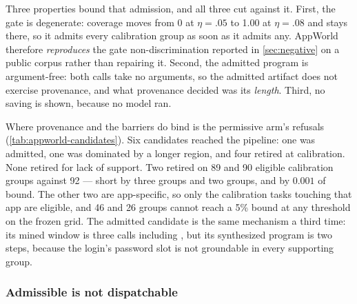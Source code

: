Three properties bound that admission, and all three cut against it. First, the gate is
degenerate: coverage moves from 0 at $\eta=.05$ to 1.00 at $\eta=.08$ and stays there, so it
admits every calibration group as soon as it admits any. AppWorld therefore \emph{reproduces}
the gate non-discrimination reported in \cref{sec:negative} on a public corpus rather than
repairing it. Second, the admitted program is argument-free: both calls take no arguments, so
the admitted artifact does not exercise provenance, and what provenance decided was its
\emph{length}. Third, no saving is shown, because no model ran.

\begin{table}[t]
  \centering
  \caption{Every candidate the deployable pipeline reached in the permissive arm. The
  refusals are not support failures: two miss on 89 and 90 eligible calibration groups
  against the 92 required, at $U=0.051$ against $\alpha=0.05$. Two rows mine a three-call
  window but synthesize two steps, because the login password slot is not groundable in
  every supporting group --- the maximal-justified-prefix retirement of
  \cref{fig:provenance-wiring}, on a public corpus.}
  \label{tab:appworld-candidates}
  \footnotesize
  \resizebox{\textwidth}{!}{}
\end{table}

Where provenance and the barriers do bind is the permissive arm's refusals
(\cref{tab:appworld-candidates}). Six candidates reached the pipeline: one was admitted, one
was dominated by a longer region, and four retired at calibration. None retired for lack of
support. Two retired on 89 and 90 eligible calibration groups against 92 --- short by three
groups and two groups, and by $0.001$ of bound. The other two are app-specific, so only the
calibration tasks touching that app are eligible, and 46 and 26 groups cannot reach a 5\%
bound at any threshold on the frozen grid. The admitted candidate is the same mechanism a
third time: its mined window is three calls including , but its synthesized
program is two steps, because the login's password slot is not groundable in every supporting
group.

\subsubsection{Admissible is not dispatchable}
\label{sec:appworld-dispatch}

\begin{table}[t]
  \centering
  \caption{Structural dispatch eligibility of the admitted AppWorld artifact on the 28
  released official baseline runs, by agent architecture. Eligibility is the admitted
  program's exact call sequence at normalized position~0, so it is an upper bound on $\phi$
  and not $\phi$: the manifest check and the calibrated gate are not evaluated, and the
  released logs retain API calls rather than model boundaries. A miss is a clean abstention
  to the unchanged agent.}
  \label{tab:appworld-dispatch}
  \footnotesize
  \resizebox{\columnwidth}{!}{}
\end{table}

